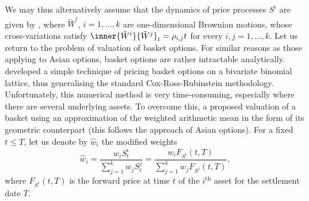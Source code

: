 We may thus alternatively assume that the dynamics of price processes \(S^i\) are given by , where \(\tilde{W}^i\), \(i=1,\dots,k\) are one-dimensional Brownian motions, whose cross-variations satisfy \(\inner{\tilde{W}^i}{\tilde{W}^j}_t = \rho_{i,j} t\) for every \(i,j=1,\dots,k\). Let us return to the problem of valuation of basket options. For similar reasons as those applying to Asian options, basket options are rather intractable analytically. developed a simple technique of pricing basket options on a bivariate binomial lattice, thus generalising the standard Cox-Ross-Rubinstein methodology. Unfortunately, this numerical method is very time-consuming, especially where there are several underlying assets. To overcome this, a proposed valuation of a basket using an approximation of the weighted arithmetic mean in the form of its geometric counterpart (this follows the approach of Asian options). For a fixed \(t \le T\), let us denote by \(\hat{w}_i\) the modified weights
\begin{equation} \label{eq:ModifiedWeights}
	\hat{w}_i = \frac{w_i S_t^i}{\sum_{j=1}^k w_j S_t^j} = \frac{w_i F_{S^i}(t, T)}{\sum_{j=1}^k w_j F_{S^j}(t, T)},
\end{equation}
where \(F_{S^i}(t, T)\) is the forward price at time \(t\) of the \(i^{\text{th}}\) asset for the settlement date \(T\).

